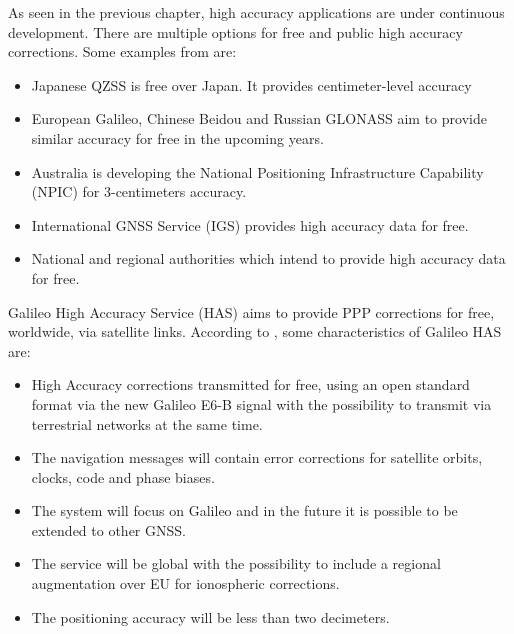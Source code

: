 As seen in the previous chapter, high accuracy applications are under continuous development. There are multiple options for free and public high accuracy corrections\cite{galileoHasPolicy}. Some examples from \cite{galileoHasPolicy} are:
\begin{itemize}
    \item Japanese QZSS is free over Japan. It provides centimeter-level accuracy
    \item European Galileo, Chinese Beidou and Russian GLONASS aim to provide similar accuracy for free in the upcoming years.
    \item Australia is developing the National Positioning Infrastructure Capability (NPIC) for 3-centimeters accuracy.
    \item International GNSS Service (IGS) provides high accuracy data for free.
    \item National and regional authorities which intend to provide high accuracy data for free.
\end{itemize}

Galileo High Accuracy Service (HAS) aims to provide PPP corrections for free, worldwide, via satellite links. According to \cite{galileoHasPolicy}, some characteristics of Galileo HAS are:
\begin{itemize}
    \item High Accuracy corrections transmitted for free, using an open standard format via the new Galileo E6-B signal with the possibility to transmit via terrestrial networks at the same time.
    \item The navigation messages will contain error corrections for satellite orbits, clocks, code and phase biases.
    \item The system will focus on Galileo and in the future it is possible to be extended to other GNSS.
    \item The service will be global with the possibility to include a regional augmentation over EU for ionospheric corrections.
    \item The positioning accuracy will be less than two decimeters.
\end{itemize}

